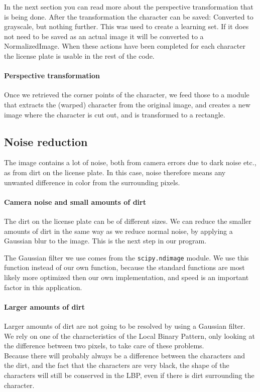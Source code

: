 \documentclass[a4paper]{article}
\begin{document}
In the next section you can read more about the perspective transformation that
is being done. After the transformation the character can be saved: Converted
to grayscale, but nothing further. This was used to create a learning set. If
it does not need to be saved as an actual image it will be converted to a
NormalizedImage. When these actions have been completed for each character the
license plate is usable in the rest of the code.

\paragraph*{Perspective transformation}
Once we retrieved the corner points of the character, we feed those to a
module that extracts the (warped) character from the original image, and
creates a new image where the character is cut out, and is transformed to a
rectangle.

\subsection{Noise reduction}

The image contains a lot of noise, both from camera errors due to dark noise
etc., as from dirt on the license plate. In this case, noise therefore means
any unwanted difference in color from the surrounding pixels.

\paragraph*{Camera noise and small amounts of dirt}
The dirt on the license plate can be of different sizes. We can reduce the
smaller amounts of dirt in the same way as we reduce normal noise, by applying
a Gaussian blur to the image. This is the next step in our program.

The Gaussian filter we use comes from the \texttt{scipy.ndimage} module. We use
this function instead of our own function, because the standard functions are
most likely more optimized then our own implementation, and speed is an
important factor in this application.

\paragraph*{Larger amounts of dirt}
Larger amounts of dirt are not going to be resolved by using a Gaussian filter.
We rely on one of the characteristics of the Local Binary Pattern, only looking
at the difference between two pixels, to take care of these problems. \\
Because there will probably always be a difference between the characters and
the dirt, and the fact that the characters are very black, the shape of the
characters will still be conserved in the LBP, even if there is dirt
surrounding the character.
\end{document}
